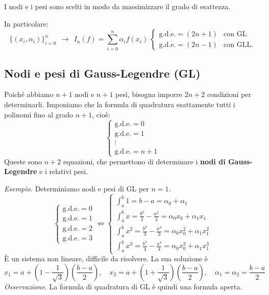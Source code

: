I nodi e i pesi sono scelti in modo da massimizzare il grado di esattezza.

In particolare:
\begin{equation*}
\{( x_{i} ,\alpha _{i})\}^{n}_{i=0} \ \ \rightarrow \ \ I_{n}(f) =\sum\limits ^{n}_{i=0} \alpha _{i} f( x_{i}) \ \begin{cases}
\text{g.d.e.} =( 2n+1) & \text{con GL}\\
\text{g.d.e.} =( 2n-1) & \text{con GLL.}
\end{cases}
\end{equation*}

\subsection{Nodi e pesi di Gauss-Legendre (GL)}
Poiché abbiamo $n+1$ nodi e $n+1$ pesi, bisogna imporre $2n+2$ condizioni per determinarli. Imponiamo che la formula di quadratura esattamente tutti i polinomi fino al grado $n+1$, cioè:
\[
\begin{cases}
    \text{g.d.e.}=0\\
    \text{g.d.e.}=1\\
    \vdots\\
    \text{g.d.e.}=n+1
\end{cases}
\]
Queste sono $n+2$ equazioni, che permettono di determinare i \textbf{nodi di Gauss-Legendre} e i relativi pesi.

\textit{Esempio.} Determiniamo nodi e pesi di GL per $n=1$.
\[
\begin{cases}
    \text{g.d.e.}=0\\
    \text{g.d.e.}=1\\
    \text{g.d.e.}=2\\
    \text{g.d.e.}=3
\end{cases}\iff 
\begin{cases}
    \int_a^b 1=b-a=\alpha_0+\alpha_1\\
    \int_a^b x=\frac{b^2}2-\frac{a^2}2=\alpha_0 x_0+\alpha_1 x_1\\
    \int_a^b x^2=\frac{b^3}3-\frac{a^3}3=\alpha_0 x_0^2+\alpha_1 x_1^2\\
    \int_a^b x^3=\frac{b^4}4-\frac{a^4}4=\alpha_0 x_0^3+\alpha_1 x_1^3
\end{cases}
\]
È un sistema non lineare, difficile da risolvere. La sua soluzione è 
\[
x_1= a+\left(1-\frac1{\sqrt 3}\right)\left(\frac{b-a}2\right),\quad x_2= a+\left(1+\frac1{\sqrt 3}\right)\left(\frac{b-a}2\right),\quad \alpha_1=\alpha_2 =\frac{b-a}{2}
\]
\textit{Osservazione.} La formula di quadratura di GL è quindi una formula aperta.

